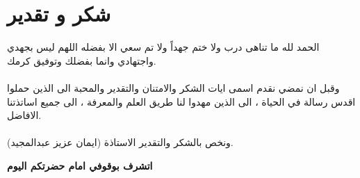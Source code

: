 \chapter*{شكر و تقدير}

الحمد لله ما تناهى درب ولا ختم جهداً ولا تم سعي الا بفضله اللهم ليس بجهدي واجتهادي وانما بفضلك وتوفيق كرمك.\\ \\
\noindent
وقبل ان نمضي نقدم اسمى ايات الشكر والامتنان والتقدير والمحبة الى الذين حملوا اقدس رسالة في الحياة ، الى الذين مهدوا لنا طريق العلم والمعرفة ، الى جميع اساتذتنا الافاضل. \\ \\
\noindent
ونخص بالشكر والتقدير الاستاذة (ايمان عزيز عبدالمجيد).\\
\begin{center}
	\textbf{اتشرف بوقوفي امام حضرتكم اليوم}
\end{center}

